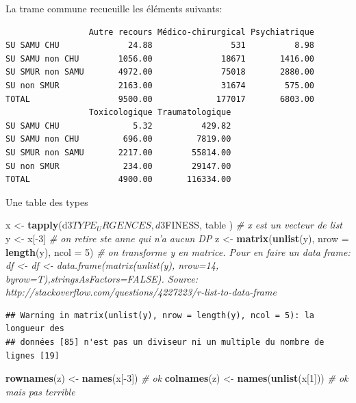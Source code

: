 \documentclass[]{article}
\newenvironment{Shaded}{\begin{snugshade}}{\end{snugshade}}
\newcommand{\KeywordTok}[1]{\textcolor[rgb]{0.13,0.29,0.53}{\textbf{{#1}}}}
\newcommand{\DataTypeTok}[1]{\textcolor[rgb]{0.13,0.29,0.53}{{#1}}}
\newcommand{\DecValTok}[1]{\textcolor[rgb]{0.00,0.00,0.81}{{#1}}}
\newcommand{\StringTok}[1]{\textcolor[rgb]{0.31,0.60,0.02}{{#1}}}
\newcommand{\CommentTok}[1]{\textcolor[rgb]{0.56,0.35,0.01}{\textit{{#1}}}}
\newcommand{\NormalTok}[1]{{#1}}
\begin{document}
La trame commune recueuille les éléments suivants:

\begin{verbatim}
                 Autre recours Médico-chirurgical Psychiatrique
SU SAMU CHU              24.88                531          8.98
SU SAMU non CHU        1056.00              18671       1416.00
SU SMUR non SAMU       4972.00              75018       2880.00
SU non SMUR            2163.00              31674        575.00
TOTAL                  9500.00             177017       6803.00
                 Toxicologique Traumatologique
SU SAMU CHU               5.32          429.82
SU SAMU non CHU         696.00         7819.00
SU SMUR non SAMU       2217.00        55814.00
SU non SMUR             234.00        29147.00
TOTAL                  4900.00       116334.00
\end{verbatim}

Une table des types

\begin{Shaded}
\begin{Highlighting}[]
\NormalTok{x <-}\StringTok{ }\KeywordTok{tapply}\NormalTok{(d3$TYPE_URGENCES, d3$FINESS, table ) }\CommentTok{# x est un vecteur de list}
\NormalTok{y <-}\StringTok{ }\NormalTok{x[-}\DecValTok{3}\NormalTok{] }\CommentTok{# on retire ste anne qui n'a aucun DP}
\NormalTok{z <-}\StringTok{ }\KeywordTok{matrix}\NormalTok{(}\KeywordTok{unlist}\NormalTok{(y), }\DataTypeTok{nrow =} \KeywordTok{length}\NormalTok{(y), }\DataTypeTok{ncol =} \DecValTok{5}\NormalTok{) }\CommentTok{# on transforme y en matrice. Pour en faire un data frame: df <- df <- data.frame(matrix(unlist(y), nrow=14, byrow=T),stringsAsFactors=FALSE). Source: http://stackoverflow.com/questions/4227223/r-list-to-data-frame}
\end{Highlighting}
\end{Shaded}

\begin{verbatim}
## Warning in matrix(unlist(y), nrow = length(y), ncol = 5): la longueur des
## données [85] n'est pas un diviseur ni un multiple du nombre de lignes [19]
\end{verbatim}

\begin{Shaded}
\begin{Highlighting}[]
\KeywordTok{rownames}\NormalTok{(z) <-}\StringTok{ }\KeywordTok{names}\NormalTok{(x[-}\DecValTok{3}\NormalTok{]) }\CommentTok{# ok}
\KeywordTok{colnames}\NormalTok{(z) <-}\StringTok{ }\KeywordTok{names}\NormalTok{(}\KeywordTok{unlist}\NormalTok{(x[}\DecValTok{1}\NormalTok{])) }\CommentTok{# ok mais pas terrible}
\end{Highlighting}
\end{Shaded}
\end{document}
